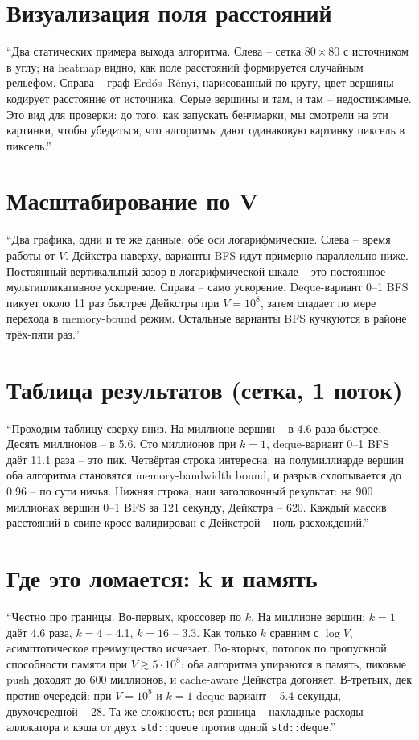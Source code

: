 \documentclass[11pt,a4paper]{article}
\begin{document}
\section{Визуализация поля расстояний}
``Два статических примера выхода алгоритма. Слева -- сетка $80\times80$
с источником в углу; на heatmap видно, как поле расстояний формируется
случайным рельефом. Справа -- граф Erdős--Rényi, нарисованный по
кругу, цвет вершины кодирует расстояние от источника. Серые вершины и
там, и там -- недостижимые. Это вид для проверки: до того, как
запускать бенчмарки, мы смотрели на эти картинки, чтобы убедиться,
что алгоритмы дают одинаковую картинку пиксель в пиксель.''
\hrulefill

\section{Масштабирование по V}
``Два графика, одни и те же данные, обе оси логарифмические. Слева --
время работы от $V$. Дейкстра наверху, варианты BFS идут примерно
параллельно ниже. Постоянный вертикальный зазор в логарифмической
шкале -- это постоянное мультипликативное ускорение. Справа -- само
ускорение. Deque-вариант 0--1 BFS пикует около 11 раз быстрее Дейкстры
при $V=10^8$, затем спадает по мере перехода в memory-bound режим.
Остальные варианты BFS кучкуются в районе трёх-пяти раз.''
\hrulefill

\section{Таблица результатов (сетка, 1 поток)}
``Проходим таблицу сверху вниз. На миллионе вершин -- в 4.6 раза
быстрее. Десять миллионов -- в 5.6. Сто миллионов при $k=1$,
deque-вариант 0--1 BFS даёт 11.1 раза -- это пик. Четвёртая строка
интересна: на полумиллиарде вершин оба алгоритма становятся
memory-bandwidth bound, и разрыв схлопывается до 0.96 -- по сути
ничья. Нижняя строка, наш заголовочный результат: на 900 миллионах
вершин 0--1 BFS за 121 секунду, Дейкстра -- 620. Каждый массив
расстояний в свипе кросс-валидирован с Дейкстрой -- ноль расхождений.''
\hrulefill

\section{Где это ломается: k и память}
``Честно про границы. Во-первых, кроссовер по $k$. На миллионе вершин:
$k=1$ даёт 4.6 раза, $k=4$ -- 4.1, $k=16$ -- 3.3. Как только $k$
сравним с $\log V$, асимптотическое преимущество исчезает. Во-вторых,
потолок по пропускной способности памяти при $V \gtrsim 5 \cdot 10^8$:
оба алгоритма упираются в память, пиковые push доходят до 600
миллионов, и cache-aware Дейкстра догоняет. В-третьих, дек против
очередей: при $V=10^8$ и $k=1$ deque-вариант -- 5.4 секунды,
двухочередной -- 28. Та же сложность; вся разница -- накладные
расходы аллокатора и кэша от двух \texttt{std::queue} против одной
\texttt{std::deque}.''
\hrulefill
\end{document}
